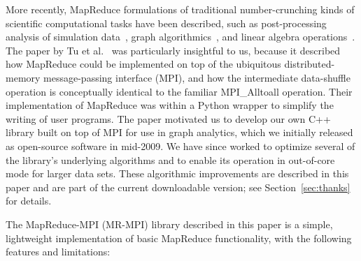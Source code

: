 More recently, MapReduce formulations of traditional number-crunching
kinds of scientific computational tasks have been described, such as
post-processing analysis of simulation data~\cite{Tu08}, graph
algorithmics~\cite{Cohen09}, and linear algebra
operations~\cite{Ekanayake09}.  The paper by Tu et al.~\cite{Tu08} was
particularly insightful to us, because it described how MapReduce
could be implemented on top of the ubiquitous distributed-memory
message-passing interface (MPI), and how the intermediate data-shuffle
operation is conceptually identical to the familiar MPI\_Alltoall
operation.  Their implementation of MapReduce was within a Python
wrapper to simplify the writing of user programs.  The paper motivated
us to develop our own C++ library built on top of MPI for use in graph
analytics, which we initially released as open-source software in
mid-2009.  We have since worked to optimize several of the library's
underlying algorithms and to enable its operation in out-of-core mode
for larger data sets.  These algorithmic improvements are described in
this paper and are part of the current downloadable version; see
Section~\ref{sec:thanks} for details.

The MapReduce-MPI (MR-MPI) library described in this paper is a
simple, lightweight implementation of basic MapReduce functionality,
with the following features and limitations:

